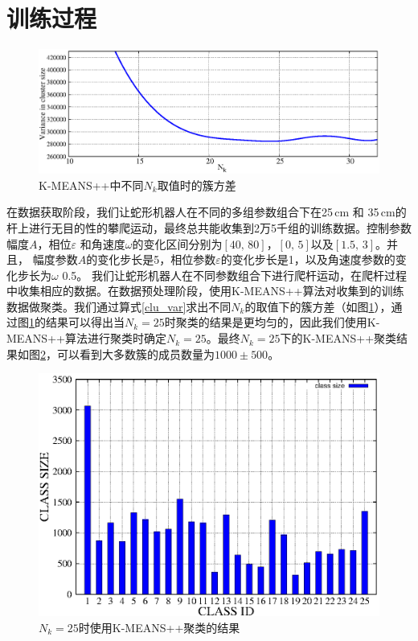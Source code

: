 \section{训练过程}
\begin{figure}[htbp]
	\centering
	\includegraphics[width=0.8\linewidth,height=0.3\textheight]{figure/chap05/clusize.eps}
	\caption{K-MEANS++中不同$N_{k}$取值时的簇方差}
	\label{fig:clusize}
\end{figure}

在数据获取阶段，我们让蛇形机器人在不同的多组参数组合下在25\,cm 和 35\,cm的杆上进行无目的性的攀爬运动，最终总共能收集到2万5千组的训练数据。控制参数幅度$A$，相位$\varepsilon$ 和角速度$\omega$的变化区间分别为$[40, \, 80]$，$[0, \, 5]$以及$[1.5, \, 3]$。并且， 幅度参数$A$的变化步长是5，相位参数$\varepsilon$的变化步长是1，以及角速度参数的变化步长为$\omega$ 0.5。 我们让蛇形机器人在不同参数组合下进行爬杆运动，在爬杆过程中收集相应的数据。在数据预处理阶段，使用K-MEANS++算法对收集到的训练数据做聚类。我们通过算式\ref{clu_var}求出不同$N_{k}$的取值下的簇方差（如图\ref{fig:clusize}），通过图\ref{fig:clusize}的结果可以得出当$N_{k}=25$时聚类的结果是更均匀的，因此我们使用K-MEANS++算法进行聚类时确定$N_{k}=25$。最终$N_{k}=25$下的K-MEANS++聚类结果如图\ref{fig:clustersize}，可以看到大多数簇的成员数量为$1000 \pm 500 $。

\begin{figure}[htbp]
	\centering
	\includegraphics[width=0.6\linewidth]{figure/chap05/cluster.eps}
	\caption{$N_{k}=25$时使用K-MEANS++聚类的结果}
	\label{fig:clustersize}
\end{figure}

